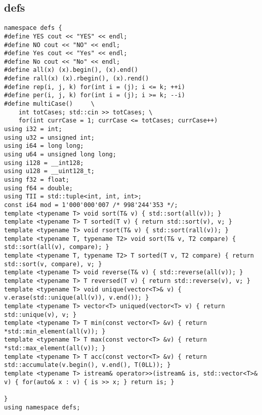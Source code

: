\subsection{defs}
\begin{lstlisting}
namespace defs {
#define YES cout << "YES" << endl;
#define NO cout << "NO" << endl;
#define Yes cout << "Yes" << endl;
#define No cout << "No" << endl;
#define all(x) (x).begin(), (x).end()
#define rall(x) (x).rbegin(), (x).rend()
#define rep(i, j, k) for(int i = (j); i <= k; ++i)
#define per(i, j, k) for(int i = (j); i >= k; --i)
#define multiCase()     \
    int totCases; std::cin >> totCases; \
    for(int currCase = 1; currCase <= totCases; currCase++)
using i32 = int;
using u32 = unsigned int;
using i64 = long long;
using u64 = unsigned long long;
using i128 = __int128;
using u128 = __uint128_t;
using f32 = float;
using f64 = double;
using TII = std::tuple<int, int, int>;
const i64 mod = 1'000'000'007 /* 998'244'353 */;
template <typename T> void sort(T& v) { std::sort(all(v)); }
template <typename T> T sorted(T v) { return std::sort(v), v; }
template <typename T> void rsort(T& v) { std::sort(rall(v)); }
template <typename T, typename T2> void sort(T& v, T2 compare) { std::sort(all(v), compare); }
template <typename T, typename T2> T sorted(T v, T2 compare) { return std::sort(v, compare), v; }
template <typename T> void reverse(T& v) { std::reverse(all(v)); }
template <typename T> T reversed(T v) { return std::reverse(v), v; }
template <typename T> void unique(vector<T>& v) { v.erase(std::unique(all(v)), v.end()); }
template <typename T> vector<T> uniqued(vector<T> v) { return std::unique(v), v; }
template <typename T> T min(const vector<T> &v) { return *std::min_element(all(v)); }
template <typename T> T max(const vector<T> &v) { return *std::max_element(all(v)); }
template <typename T> T acc(const vector<T> &v) { return std::accumulate(v.begin(), v.end(), T(0LL)); }
template <typename T> istream& operator>>(istream& is, std::vector<T>& v) { for(auto& x : v) { is >> x; } return is; }

}
using namespace defs;
\end{lstlisting}

